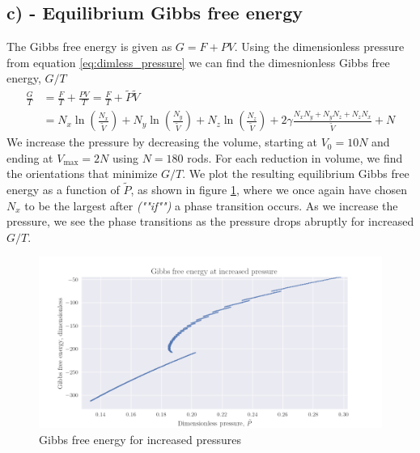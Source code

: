 \documentclass[reprint,english,notitlepage,aps,nobalancelastpage,nofootinbib]{revtex4-1}
\newcommand{\closed}[1]{\left(#1\right)}
\newcommand{\nx}{N_x}
\newcommand{\ny}{N_y}
\newcommand{\nz}{N_z}
\newcommand{\V}{\tilde{V}}
\renewcommand{\P}{\tilde{P}}
\begin{document}
\subsection*{c) - Equilibrium Gibbs free energy}
The Gibbs free energy is given as $G=F+PV$. Using the dimensionless pressure from equation \eqref{eq:dimless_pressure} we can find the dimesnionless Gibbs free energy, $G/T$
\begin{align*}
	\frac{G}{T} &= \frac{F}{T} + \frac{PV}{T} = \frac{F}{T} + \P\V \\
	&= N_x \ln\closed{\frac{N_x}{\tilde{V}}} + N_y \ln\closed{\frac{N_y}{\tilde{V}}} + N_z \ln\closed{\frac{N_z}{\tilde{V}}} + 2\gamma \frac{\nx\ny+\ny\nz+\nz\nx}{\tilde{V}} + N 
\end{align*}
We increase the pressure by decreasing the volume, starting at $V_0=10N$ and ending at $V_\mathrm{max}=2N$ using $N=180$ rods. For each reduction in volume, we find the orientations that minimize $G/T$. We plot the resulting equilibrium Gibbs free energy as a function of $\P$, as shown in figure \ref{fig:G}, where we once again have chosen $\nx$ to be the largest after \textit{(""if"")} a phase transition occurs. As we increase the pressure, we see the phase transitions as the pressure drops abruptly for increased $G/T$. 

\begin{figure}[h!]
	\centering
	\includegraphics[width=0.8\linewidth]{gibbs_free_energy.pdf}
	\caption{Gibbs free energy for increased pressures}
	\label{fig:G}
\end{figure}
\end{document}
